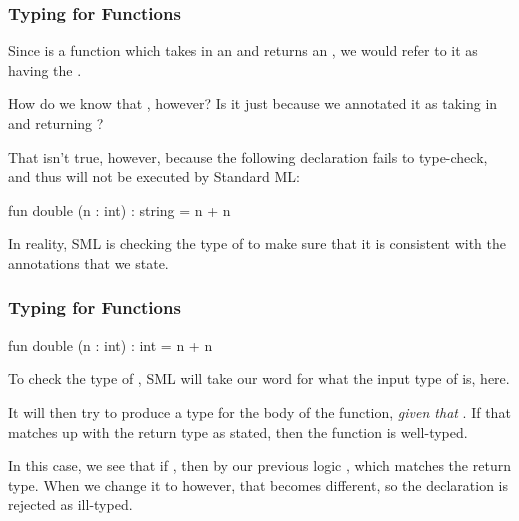 \documentclass[aspectratio=169, handout]{beamer}
\begin{document}
\begin{frame}[fragile]
  \frametitle{Typing for Functions}

  Since  is a function which takes in an  and returns an ,
  we would refer to it as having the  .

  \pause
  \vspace{\fill}

  How do we know that , however? Is it just because we annotated
  it as taking in  and returning ?

  \pause
  \vspace{\fill}

  That isn't true, however, because the following declaration fails to type-check, and thus
  will not be executed by Standard ML:

  \vspace{5pt}

  \begin{codeblock}
    fun double (n : int) : string = n + n
  \end{codeblock}

  \pause
  \vspace{\fill}

  In reality, SML is checking the type of  to make sure that it is consistent
  with the annotations that we state.
\end{frame}

\begin{frame}[fragile]
  \frametitle{Typing for Functions}

  \begin{codeblock}
    fun double (n : int) : int = n + n
  \end{codeblock}

  \pause

  To check the type of , SML will take our word for what the input type
  of  is, here.

  \pause
  \vspace{\fill}

  It will then try to produce a type for the body of the function, \textit{given that}
  . If that matches up with the return type as stated, then the function is
  well-typed.

  \pause
  \vspace{\fill}

  In this case, we see that if , then by our previous logic ,
  which matches the return type. When we change it to  however, that becomes
  different, so the declaration is rejected as ill-typed.
\end{frame}
\end{document}
